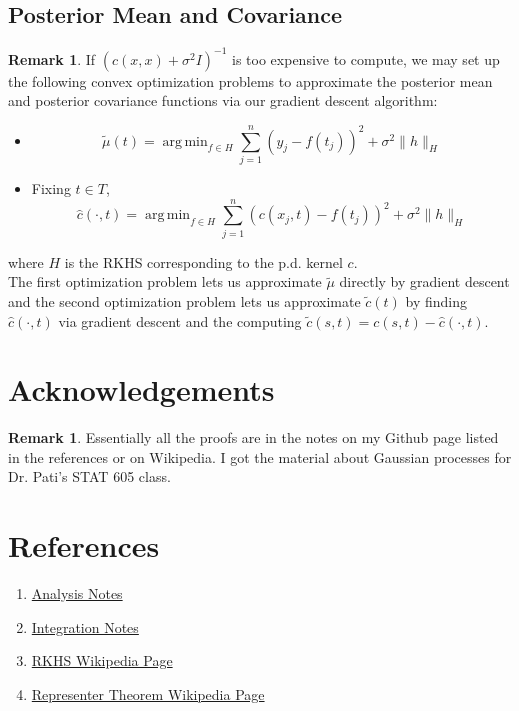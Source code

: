 \documentclass[twoside]{article}
\theoremstyle{definition}
\theoremstyle{definition}
\newtheorem{rem}[definition]{Remark}
\newcommand{\sig}{\sigma}
\DeclareMathOperator*{\argmin}{arg\,min}
\begin{document}
\subsection{Posterior Mean and Covariance}
\begin{rem}
If $(c(x,x) + \sig^2I)^{-1}$ is too expensive to compute, we may set up the following convex optimization problems to approximate the posterior mean and posterior covariance functions via our gradient descent algorithm:
\begin{itemize}
\item $$\tilde{\mu}(t) = \argmin_{f \in H} \sum_{j=1}^n (y_j - f(t_j))^2 + \sig^2 \|h\|_H$$ 
\item Fixing $t \in T$, $$\hat{c}(\cdot, t) = \argmin_{f \in H} \sum_{j=1}^n (c(x_j, t) - f(t_j))^2 + \sig^2 \|h\|_H$$
\end{itemize}
where $H$ is the RKHS corresponding to the p.d. kernel $c$. \\
The first optimization problem lets us approximate $\tilde{\mu}$ directly by gradient descent and the second optimization problem lets us approximate $\tilde{c}(t)$ by finding $\hat{c}(\cdot, t)$ via gradient descent and the computing $\tilde{c}(s, t) = c(s, t) - \hat{c}(\cdot, t)$.
\end{rem}

\section*{Acknowledgements}
\begin{rem}
Essentially all the proofs are in the notes on my Github page listed in the references or on Wikipedia. I got the material about Gaussian processes for Dr. Pati's STAT 605 class.  
\end{rem}

\section*{References}
\begin{enumerate}
\item \href{https://github.com/carsonaj/Mathematics/blob/master/Introduction\%20to\%20Analysis/Introduction\%20to\%20Analysis.pdf}{Analysis Notes}

\item \href{https://github.com/carsonaj/Mathematics/blob/master/Introduction\%20to\%20Measure\%20and\%20Integration/Introduction\%20to\%20Measure\%20and\%20Integration.pdf}{Integration Notes}

\item \href{https://en.wikipedia.org/wiki/Reproducing_kernel_Hilbert_space}{RKHS Wikipedia Page}

\item \href{https://en.wikipedia.org/wiki/Representer_theorem}{Representer Theorem Wikipedia Page}
\end{enumerate}
\end{document}

